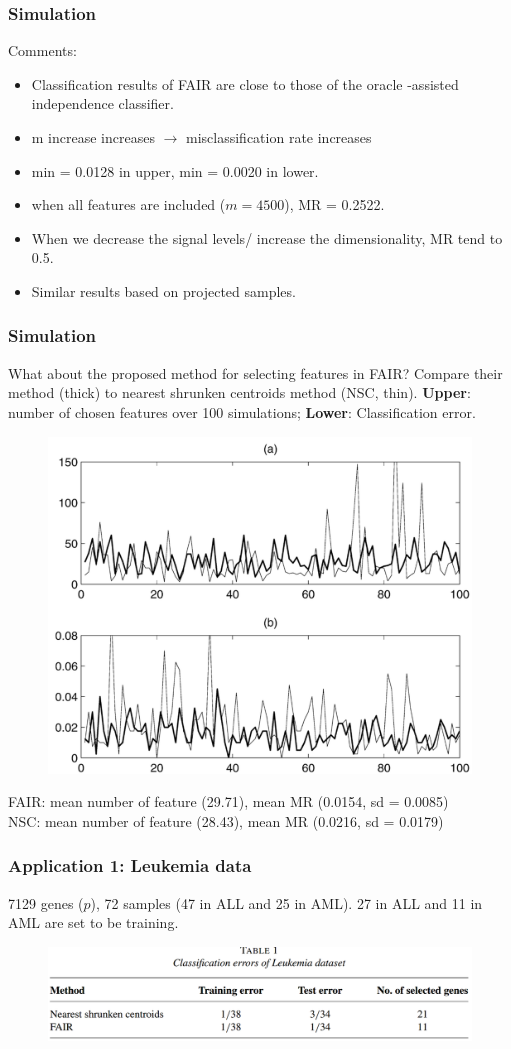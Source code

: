 \documentclass{beamer}
\begin{document}
	\begin{frame}
		\frametitle{Simulation}
		Comments:
		\begin{itemize}
			\item
			Classification results of FAIR are close to those of the oracle -assisted independence classifier.
			\item
			m increase increases $\rightarrow$ misclassification rate increases 
			\item
			min = 0.0128 in upper, min = 0.0020 in lower.
			\item
			when all features are included ($m = 4500$),
			MR = 0.2522.
			\item
			When we decrease the signal levels/ increase the dimensionality, MR tend to 0.5.
			\item
			Similar results based on projected samples. 
		\end{itemize}
	\end{frame}
	
	\begin{frame}
		\frametitle{Simulation}
		What about the proposed method for selecting features in FAIR? Compare their method (thick) to nearest shrunken centroids method (NSC, thin). \textbf{Upper}: number of chosen features over 100 simulations; \textbf{Lower}: Classification error.
		\begin{figure}
			\includegraphics[width=.4\linewidth]{image015.png}
		\end{figure}
		FAIR: mean number of feature (29.71), mean MR (0.0154, sd = 0.0085)\\
		NSC: mean number of feature (28.43), mean MR (0.0216, sd = 0.0179)
	\end{frame}
	
	\begin{frame}
		\frametitle{Application 1: Leukemia data}
		7129 genes ($p$), 72 samples (47 in ALL and 25 in AML). 27 in ALL and 11 in AML are set to be training.
		\begin{figure}
			\includegraphics[width=.8\linewidth]{image016.png}
		\end{figure} 
	\end{frame}
	
\end{document}

